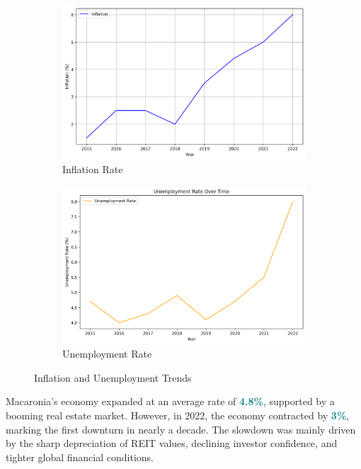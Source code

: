 \begin{figure}[h]
    \centering
    \begin{subfigure}{0.48\textwidth}
        \centering
        \includegraphics[width=\textwidth]{inflation.png}
        \caption{\small Inflation Rate}
        \label{fig:inflation}
    \end{subfigure}
    \hfill
    \begin{subfigure}{0.48\textwidth}
        \centering
        \includegraphics[width=\textwidth]{unemployment.png}
        \caption{\small Unemployment Rate}
        \label{fig:unemployment}
    \end{subfigure}
    \caption{Inflation and Unemployment Trends}  %
    \label{fig:main_figure}  %
\end{figure}


Macaronia's economy expanded at an average rate of 
\textcolor{teal}{\textbf{4.8\%}}, supported by a booming real estate market. However,
in 2022, the economy contracted by \textcolor{teal}{\textbf{3\%}}, marking the first downturn in nearly a 
decade. The slowdown was mainly driven by the sharp depreciation of REIT values, declining investor confidence,
and tighter global financial conditions.

